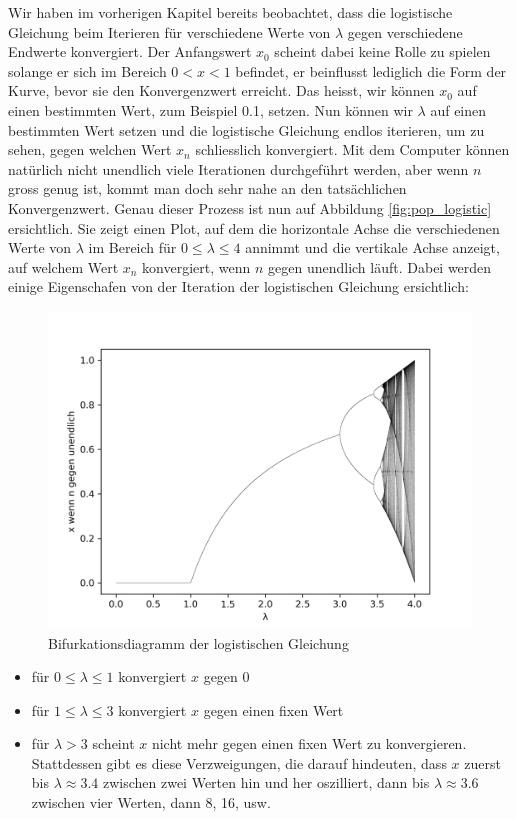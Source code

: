 Wir haben im vorherigen Kapitel bereits beobachtet, 
dass die logistische Gleichung beim Iterieren für 
verschiedene Werte von $\lambda$ gegen verschiedene 
Endwerte konvergiert. 
Der Anfangswert $x_0$ scheint dabei keine Rolle zu spielen
solange er sich im Bereich $0 < x < 1$ befindet, 
er beinflusst lediglich die Form der Kurve, 
bevor sie den Konvergenzwert erreicht. 
Das heisst, wir können $x_0$ auf einen bestimmten Wert, 
zum Beispiel 0.1, setzen. 
Nun können wir $\lambda$ auf einen bestimmten Wert setzen
und die logistische Gleichung endlos iterieren, 
um zu sehen, gegen welchen Wert $x_n$ schliesslich konvergiert.
Mit dem Computer können natürlich nicht unendlich viele Iterationen
durchgeführt werden, aber wenn $n$ gross genug ist, 
kommt man doch sehr nahe an den tatsächlichen Konvergenzwert. 
Genau dieser Prozess ist nun auf Abbildung \ref{fig:pop_logistic} 
ersichtlich. 
Sie zeigt einen Plot, 
auf dem die horizontale Achse die verschiedenen Werte
von $\lambda$ im Bereich für $0 \leq \lambda \leq 4$ annimmt 
und die vertikale Achse anzeigt,
auf welchem Wert $x_n$ konvergiert, wenn $n$ gegen
unendlich läuft. Dabei werden einige Eigenschafen 
von der Iteration der logistischen Gleichung ersichtlich:
\begin{figure}
    \includegraphics[width=\linewidth]{papers/logistic/figures/map.png}
    \caption{Bifurkationsdiagramm der logistischen Gleichung}
    \label{fig:map_1}
\end{figure}
\begin{itemize}
    \item 
    für $0 \le \lambda \le 1$ konvergiert $x$ gegen 0
    \item 
    für $1 \le \lambda \le 3$ konvergiert $x$ gegen einen fixen Wert
    \item 
    für $\lambda > 3$ scheint $x$ nicht mehr gegen einen fixen Wert zu konvergieren.
    Stattdessen gibt es diese Verzweigungen, 
    die darauf hindeuten, 
    dass $x$ zuerst bis $\lambda \approx 3.4$ zwischen zwei Werten hin und her oszilliert, 
    dann bis $\lambda \approx 3.6$ zwischen vier Werten, dann 8, 16, usw. 
\end{itemize}
